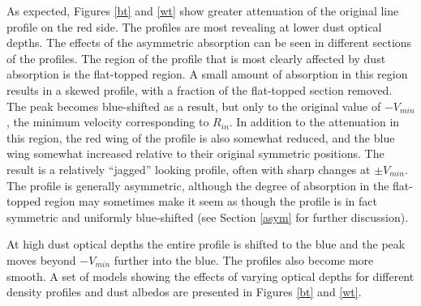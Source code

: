 \documentclass[useAMS,usenatbib,usegraphicx]{mnras}
\begin{document}
As expected, Figures \ref{bt} and \ref{wt} show greater attenuation of the original line profile on 
the red side.  The profiles are most revealing at lower 
dust optical depths.  The effects of the asymmetric absorption can be seen in 
different sections of the profiles.  The region of the profile that is 
most clearly affected by dust absorption is the flat-topped region.  A 
small amount of absorption in this region results in a skewed profile, 
with a fraction of the flat-topped section removed.  The peak becomes 
blue-shifted as a result, but only to the original value of $-V_{min}$, the minimum 
velocity corresponding to $R_{in}$. In addition to the attenuation in this region, 
the red wing of the profile is also somewhat reduced, and the blue wing 
somewhat increased relative to their original symmetric positions.  The 
result is a relatively ``jagged'' looking profile, often with sharp changes 
at $\pm V_{min}$.  The profile is generally asymmetric, although the 
degree of absorption in the flat-topped region may sometimes make it seem 
as though the profile is in fact symmetric and uniformly blue-shifted (see 
Section \ref{asym} for further discussion).

At high dust optical depths the entire profile is shifted to the blue and the 
peak moves beyond $-V_{min}$ further into the blue.  The 
profiles also become more smooth.  A set of models showing 
the effects of varying optical depths for different density profiles and 
dust albedos are presented in Figures \ref{bt} and \ref{wt}.
\end{document}
